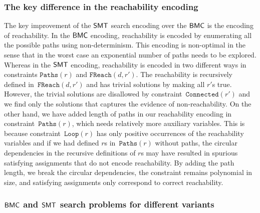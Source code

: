 
\subsubsection{The key difference in the reachability encoding}
The key improvement of the $\mathsf{SMT}$ search encoding over the $\mathsf{BMC}$ is the
encoding of reachability.
%
In the $\mathsf{BMC}$ encoding, reachability is encoded by enumerating all the possible paths using non-determinism.
%
This encoding is non-optimal in the sense that in the worst case an exponential number of paths needs to be explored.
%
Whereas in the $\mathsf{SMT}$ encoding, reachability is encoded in two different
ways in constraints $\texttt{Paths}(r)$ and $\texttt{FReach}(d,r')$.
%
The reachability is recursively defined in~$\texttt{FReach}(d,r')$ and has
trivial solutions by making all $r'$s true.
%
However, the trivial solutions are disallowed by constraint~$\texttt{Connected}(r')$ and we find
only the solutions that captures the evidence of non-reachability.
%
On the other hand, we have added length of paths in our reachability encoding in constraint~$\texttt{Paths}(r)$, which needs relatively more auxiliary variables.
%
This is because constraint~$\texttt{Loop}(r)$ has only positive
occurrences of the reachability variables and if we had defined
$r$s in~$\texttt{Paths}(r)$ without paths,
the circular dependencies in the recursive definitions of $r$s
may have resulted in spurious satisfying assignments that
do not encode reachability.
%
By adding the path length, we break the circular dependencies, the
constraint remains polynomial in size, and satisfying assignments only
correspond to correct reachability.



\subsubsection{$\mathsf{BMC}$ and $\mathsf{SMT}$ search problems for different variants}


